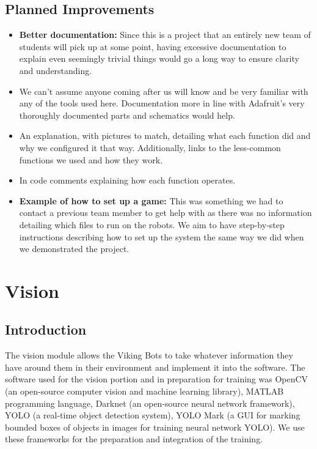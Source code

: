 \documentclass[a4paper,12pt]{article}
\begin{document}
\subsection{Planned Improvements}
	\begin{itemize}
		\item\textbf{Better documentation:} Since this is a project that an entirely new team of students will pick up at some point, having excessive documentation to explain even seemingly trivial things would go a long way to ensure clarity and understanding.
		
		\item We can't assume anyone coming after us will know and be very familiar with any of the tools used here. Documentation more in line with Adafruit’s very thoroughly documented parts and schematics would help. 

	\item An explanation, with pictures to match, detailing what each function did and why we configured it that way. Additionally, links to the less-common functions we used and how they work. 
	\item In code comments explaining how each function operates.
	\item\textbf{Example of how to set up a game:} This was something we had to contact a previous team member to get help with as there was no information detailing which files to run on the robots. We aim to have step-by-step instructions describing how to set up the system the same way we did when we demonstrated the project.
	\end{itemize}
	

	
	
\section{Vision}
\subsection{Introduction}
	The vision module allows the Viking Bots to take whatever information they have around them in their environment and implement it into the software. The software used for the vision portion and in preparation for training was OpenCV (an open-source computer vision and machine learning library), MATLAB programming language, Darknet (an open-source neural network framework), YOLO (a real-time object detection system), YOLO Mark (a GUI for marking bounded boxes of objects in images for training neural network YOLO). We use these frameworks for the preparation and integration of the training.
	
\end{document}
